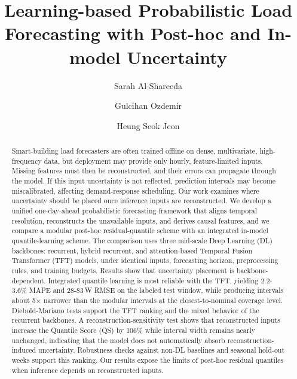 \documentclass[final,10pt,1p,authoryear]{elsarticle}
\theoremstyle{definition}
\begin{document}
\begin{frontmatter}
\title{Learning-based Probabilistic Load Forecasting with Post-hoc
and In-model Uncertainty}

\author[um,itu]{Sarah Al-Shareeda}
\author[itu]{Gulcihan Ozdemir}
\author[ku]{Heung Seok Jeon}




\begin{abstract}
Smart-building load forecasters are often trained offline on dense, multivariate, high-frequency data, but deployment may provide only hourly, feature-limited inputs. Missing features must then be reconstructed, and their errors can propagate through the model. If this input uncertainty is not reflected, prediction intervals may become miscalibrated, affecting demand-response scheduling. Our work examines where uncertainty should be placed once inference inputs are reconstructed. We develop a unified one-day-ahead probabilistic forecasting framework that aligns temporal resolution, reconstructs the unavailable inputs, and derives causal features, and we compare a modular post-hoc residual-quantile scheme with an integrated in-model quantile-learning scheme. The comparison uses three mid-scale Deep Learning (DL) backbones: recurrent, hybrid recurrent, and attention-based Temporal Fusion Transformer (TFT) models, under identical inputs, forecasting horizon, preprocessing rules, and training budgets. Results show that uncertainty placement is backbone-dependent. Integrated quantile learning is most reliable with the TFT, yielding 2.2-3.6\% MAPE and 28-83\,W RMSE on the labeled test window, while producing intervals about 5$\times$ narrower than the modular intervals at the closest-to-nominal coverage level. Diebold-Mariano tests support the TFT ranking and the mixed behavior of the recurrent backbones. A reconstruction-sensitivity test shows that reconstructed inputs increase the Quantile Score (QS) by 106\% while interval width remains nearly unchanged, indicating that the model does not automatically absorb reconstruction-induced uncertainty. Robustness checks against non-DL baselines and seasonal hold-out weeks support this ranking. Our results expose the limits of post-hoc residual quantiles when inference depends on reconstructed inputs.
\end{abstract}


\end{frontmatter}
\end{document}
